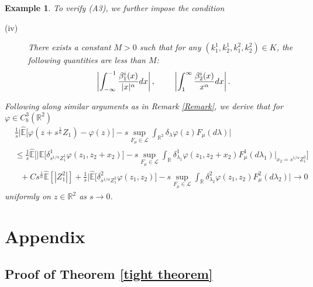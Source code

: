 \documentclass[a4paper,oneside,10pt]{article}%
\newtheorem{example}[theorem]{Example}
\numberwithin{equation}{section}
\begin{document}
\begin{example}
To verify (A3), we further impose the condition

\begin{description}
\item[(iv)] There exists a constant $M>0$ such that for any $(k_{1}^{1}%
,k_{2}^{1},k_{1}^{2},k_{2}^{2})\in K$, the following quantities are less than
$M$:
\[%
\begin{array}
[c]{lll}%
\displaystyle \left \vert \int_{-\infty}^{-1}\frac{\beta_{1}^{i}(x)}%
{|x|^{\alpha}}dx\right \vert ,\text{\ } &  & \displaystyle \left \vert \int
_{1}^{\infty}\frac{\beta_{2}^{i}(x)}{x^{\alpha}}dx\right \vert .
\end{array}
\]

\end{description}

Following along similar arguments as in Remark \ref{Remark}, we derive that
for $\varphi \in C_{b}^{3}(\mathbb{R}^{2})$
\begin{align*}
&  \frac{1}{s}\bigg \vert \mathbb{\hat{E}}\big[\varphi(z+s^{\frac{1}{\alpha}%
}Z_{1})-\varphi(z)\big]-s\sup_{F_{\mu}\in \mathcal{L}}\int_{\mathbb{R}^{2}%
}\delta_{\lambda}\varphi(z)F_{\mu}(d\lambda)\bigg \vert \\
&  \leq \frac{1}{s}\mathbb{\hat{E}}\bigg[\bigg \vert \mathbb{\hat{E}%
}\big[\delta_{s^{1/\alpha}Z_{1}^{1}}^{1}\varphi(z_{1},z_{2}+x_{2}%
)\big]-s\sup_{F_{\mu}\in \mathcal{L}}\int_{\mathbb{R}}\delta_{\lambda_{1}}%
^{1}\varphi(z_{1},z_{2}+x_{2})F_{\mu}^{1}(d\lambda_{1})\bigg \vert_{x_{2}%
=s^{1/\alpha}Z_{1}^{2}}\bigg]\\
&  \text{ \  \ }+Cs^{\frac{1}{\alpha}}\mathbb{\hat{E}}[|Z_{1}^{2}|]+\frac{1}%
{s}\bigg \vert \mathbb{\hat{E}}\big[\delta_{s^{1/\alpha}Z_{1}^{2}}^{2}%
\varphi(z_{1},z_{2})\big]-s\sup_{F_{\mu}\in \mathcal{L}}\int_{\mathbb{R}}%
\delta_{\lambda_{2}}^{2}\varphi(z_{1},z_{2})F_{\mu}^{2}(d\lambda
_{2})\bigg \vert \rightarrow0
\end{align*}
uniformly on $z\in \mathbb{R}^{2}$ as $s\rightarrow0$.
\end{example}

\section{Appendix}

\subsection{Proof of Theorem \ref{tight theorem}}
\end{document}
